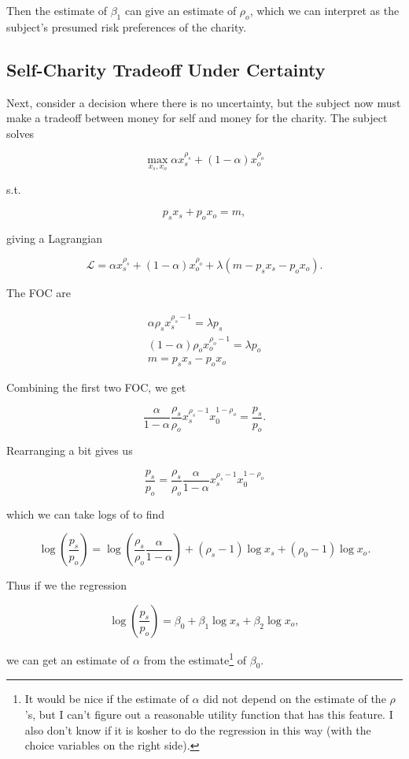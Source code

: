 \documentclass[11pt]{article}
\begin{document}
Then the estimate of $\beta_1$ can give an estimate of $\rho_o$, which we can interpret as the subject's presumed risk preferences of the charity.

\subsection{Self-Charity Tradeoff Under Certainty}

Next, consider a decision where there is no uncertainty, but the subject now must make a tradeoff between money for self and money for the charity.  The subject solves

\[
\max_{x_s, x_o}  \alpha x_s^{\rho_s} + (1-\alpha) x_o^{\rho_o}
\]

s.t.

\[
p_s x_s + p_o x_o = m,
\]

giving a Lagrangian

\[
\mathcal L =  \alpha x_s^{\rho_s} + (1-\alpha) x_o^{\rho_o} + \lambda (m - p_s x_s - p_o x_o).
\]

The FOC are

\begin{eqnarray}
 \alpha \rho_s x_{s}^{\rho_s-1} = \lambda p_{s} \\
(1- \alpha) \rho_o x_{o}^{\rho_o-1} = \lambda p_{o} \\
m = p_{s} x_{s} - p_{o} x_{o}
\end{eqnarray}

Combining the first two FOC, we get

\[
\frac{\alpha}{1-\alpha} \frac{\rho_s}{\rho_o} x_{s}^{\rho_s-1} x_{0}^{1-\rho_o} = \frac{p_s}{p_o}.
\]

Rearranging a bit gives us

\[
\frac{p_s}{p_o} = \frac{\rho_s}{\rho_o} \frac{\alpha}{1-\alpha} x_{s}^{\rho_s-1} x_{0}^{1-\rho_o} 
\]

which we can take logs of to find

\[
\log \left (\frac{p_s}{p_o} \right ) = \log \left ( \frac{\rho_s}{\rho_o}  \frac{\alpha}{1-\alpha}  \right ) + (\rho_s-1) \log x_{s} + (\rho_0-1) \log x_{o}.
\]

Thus if we the regression 

\[
\log \left (\frac{p_s}{p_o} \right ) =\beta_0 + \beta_1 \log x_{s} + \beta_2 \log x_{o},
\]

we can get an estimate of $\alpha$ from the estimate\footnote{It would be nice if the estimate of $\alpha$ did not depend on the estimate of the $\rho$'s, but I can't figure out a reasonable utility function that has this feature.  I also don't know if it is kosher to do the regression in this way (with the choice variables on the right side).} of $\beta_0$. 
\end{document}
